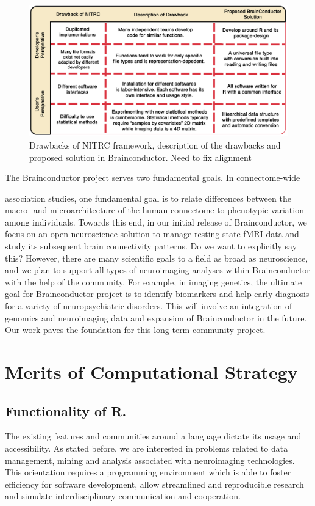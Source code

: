 \documentclass{nature}
\begin{document}
\begin{figure}[tb]
\centering
\includegraphics[width=400pt]{fig/brainconductor/brainconductor_nitrc_chart_v2.png}
\caption{Drawbacks of NITRC framework, description of the drawbacks and proposed
solution in Brainconductor. {\color{red}Need to fix alignment}
}
\label{fig:nitrc}
\end{figure}


The Brainconductor project serves two fundamental goals. In connectome-wide

association studies, one fundamental goal is to relate differences between the
macro- and microarchitecture of the human connectome to phenotypic variation among
individuals\cite{milham2012open}. Towards this end,
in our initial release of Brainconductor, we focus on an open-neuroscience
solution to manage resting-state fMRI data and study its
subsequent brain connectivity patterns. {\color{red}Do we want to explicitly say
this?}
However, there are many scientific goals to a field as broad as neuroscience,
and we plan to support all types of neuroimaging analyses within Brainconductor
with the help of the community.
For example, in imaging genetics, the ultimate goal
for Brainconductor project is to identify biomarkers and help early diagnosis
for a variety of neuropsychiatric disorders. This will involve an
integration of genomics and neuroimaging data and expansion of Brainconductor
in the future. Our work paves the foundation for this long-term community 
project.


\section{Merits of Computational Strategy}

\subsection{Functionality of R.}
The existing features and communities around a language dictate
its usage and accessibility. As stated before, we are
interested in problems related to data management, mining and analysis
associated with neuroimaging technologies. This orientation requires
a programming environment which is able to foster
efficiency for software development, allow
streamlined and reproducible research and simulate
interdisciplinary communication and cooperation.
\end{document}
